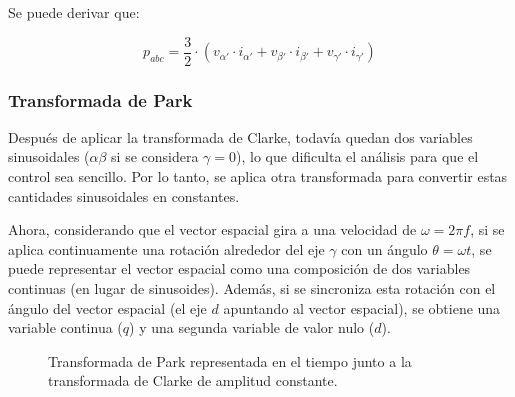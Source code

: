 Se puede derivar que:

\begin{equation}
p_{abc} = \frac{3}{2} \cdot (v_{\alpha'} \cdot i_{\alpha'} + v_{\beta'} \cdot i_{\beta'} + v_{\gamma'} \cdot i_{\gamma'})
\end{equation}


\subsubsection{Transformada de Park}

Después de aplicar la transformada de Clarke, todavía quedan dos variables sinusoidales (\(\alpha\beta\) si se considera \(\gamma = 0\)), lo que dificulta el análisis para que el control sea sencillo. Por lo tanto, se aplica otra transformada para convertir estas cantidades sinusoidales en constantes.

Ahora, considerando que el vector espacial gira a una velocidad de \(\omega = 2\pi f\), si se aplica continuamente una rotación alrededor del eje \(\gamma\) con un ángulo \(\theta = \omega  t\), se puede representar el vector espacial como una composición de dos variables continuas (en lugar de sinusoides). Además, si se sincroniza esta rotación con el ángulo del vector espacial (el eje \(d\) apuntando al vector espacial), se obtiene una variable continua (\(q\)) y una segunda variable de valor nulo (\(d\)).

\begin{figure}[H]
  	\centering
  \hspace*{-1.5cm}
  \caption{Transformada de Park representada en el tiempo junto a la transformada de Clarke de amplitud constante.}
\end{figure}

